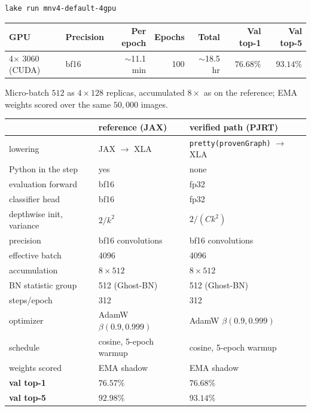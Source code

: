 \begin{verbatim}
lake run mnv4-default-4gpu
\end{verbatim}

\begin{center}
\begin{tabular}{l l r r r r r}
\hline
GPU & Precision & Per epoch & Epochs & Total & Val top-1 & Val top-5 \\
\hline
4$\times$ 3060 (CUDA) & bf16 & $\sim$11.1 min & 100 & $\sim$18.5 hr & $\mathbf{76.68\%}$ & $\mathbf{93.14\%}$ \\
\hline
\end{tabular}
\end{center}

\noindent Micro-batch $512$ as $4 \times 128$ replicas, accumulated
$8\times$ as on the reference; EMA weights scored over the same
$50{,}000$ images.


\begin{center}
\begin{tabular}{@{}l l l@{}}
\hline
 & reference (JAX) & verified path (PJRT) \\
\hline
lowering            & JAX $\to$ XLA            & \texttt{pretty(provenGraph)} $\to$ XLA \\
Python in the step  & yes                      & none \\
evaluation forward  & bf16                     & fp32 \\
classifier head     & bf16                     & fp32 \\
depthwise init, variance & $2/k^2$             & $2/(C k^2)$ \\
\hline
precision           & bf16 convolutions        & bf16 convolutions \\
effective batch     & 4096                     & 4096 \\
accumulation        & $8 \times 512$           & $8 \times 512$ \\
BN statistic group  & 512 (Ghost-BN)           & 512 (Ghost-BN) \\
steps/epoch         & 312                      & 312 \\
optimizer           & AdamW $\beta(0.9, 0.999)$ & AdamW $\beta(0.9, 0.999)$ \\
schedule            & cosine, 5-epoch warmup   & cosine, 5-epoch warmup \\
weights scored      & EMA shadow               & EMA shadow \\
\hline
\textbf{val top-1}  & $\mathbf{76.57\%}$       & $\mathbf{76.68\%}$ \\
\textbf{val top-5}  & $\mathbf{92.98\%}$       & $\mathbf{93.14\%}$ \\
\hline
\end{tabular}
\end{center}

